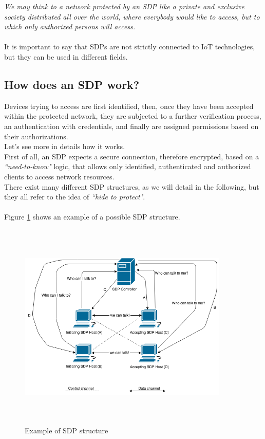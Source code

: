 \documentclass[12pt]{report}
\begin{document}
{{\emph{We may think to a network protected by an SDP like a private and exclusive society distributed all over the world, where everybody would like to access, but to which only authorized persons will access.}~\cite{protectnetwithsdp}\\\\
It is important to say that SDPs are not strictly connected to IoT technologies, but they can be used in different fields.\\

\subsection{How does an SDP work?}
\bigskip

Devices trying to access are first identified, then, once they have been accepted within the protected network, they are subjected to a further verification process, an authentication with credentials, and finally are assigned permissions based on their authorizations.\\
Let's see more in details how it works.\\

First of all, an SDP expects a secure connection, therefore encrypted, based on a \emph{``need-to-know"} logic, that allows only identified, authenticated and authorized clients to access network resources.\\
There exist many different SDP structures, as we will detail in the following, but they all refer to the idea of \emph{``hide to protect"}.\\\\

Figure \ref{fig:sdpstructure} shows an example of a possible SDP structure.

\begin{figure}[H]
\includegraphics[width=10cm,height=10cm,keepaspectratio]{sdp_structure}
\centering
\caption{Example of  SDP structure}
\label{fig:sdpstructure}
\end{figure}

}}
\end{document}
